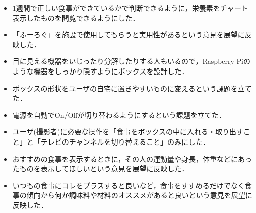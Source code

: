\documentclass[../report]{subfiles}
\begin{document}
\begin{itemize}
    \item 1週間で正しい食事ができているかで判断できるように，栄養素をチャート表示したものを閲覧できるようにした．
    \item 「ふーろぐ」を施設で使用してもらうと実用性があるという意見を展望に反映した．
    \item 目に見える機器をいじったり分解したりする人もいるので，Raspberry Piのような機器をしっかり隠すようにボックスを設計した．
    \item ボックスの形状をユーザの自宅に置きやすいものに変えるという課題を立てた．
    \item 電源を自動でOn/Offが切り替わるようにするという課題を立てた．
    \item ユーザ(撮影者)に必要な操作を「食事をボックスの中に入れる・取り出すこと」と「テレビのチャンネルを切り替えること」のみにした．
    \item おすすめの食事を表示するときに，その人の運動量や身長，体重などにあったものを表示してほしいという意見を展望に反映した．
    \item いつもの食事にコレをプラスすると良いなど，食事をすすめるだけでなく食事の傾向から何か調味料や材料のオススメがあると良いという意見を展望に反映した．
\end{itemize}
\end{document}
